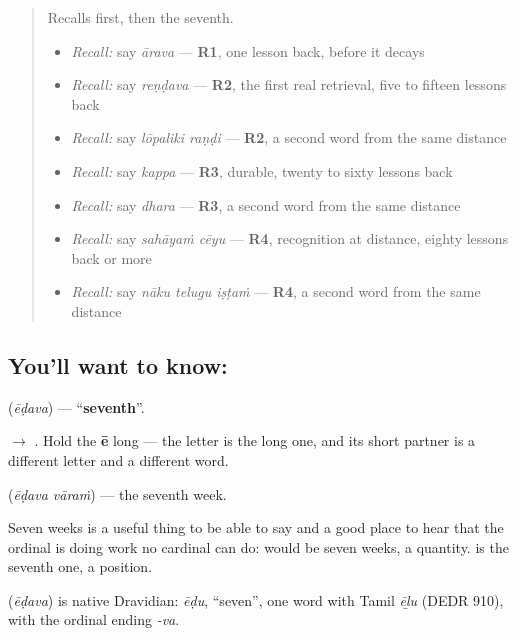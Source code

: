 \begin{quote}
Recalls first, then the seventh.

\begin{itemize}
\raggedright
  \item \emph{Recall:} say \emph{ārava} — \textbf{R1}, one lesson back, before it decays
  \item \emph{Recall:} say \emph{reṇḍava} — \textbf{R2}, the first real retrieval, five to fifteen lessons back
  \item \emph{Recall:} say \emph{lōpaliki raṇḍi} — \textbf{R2}, a second word from the same distance
  \item \emph{Recall:} say \emph{kappa} — \textbf{R3}, durable, twenty to sixty lessons back
  \item \emph{Recall:} say \emph{dhara} — \textbf{R3}, a second word from the same distance
  \item \emph{Recall:} say \emph{sahāyaṁ cēyu} — \textbf{R4}, recognition at distance, eighty lessons back or more
  \item \emph{Recall:} say \emph{nāku telugu iṣṭaṁ} — \textbf{R4}, a second word from the same distance
\end{itemize}
\end{quote}

\subsection*{You'll want to know: }
\textbf{} (\emph{ēḍava}) — \textquotedblleft{}\textbf{seventh}\textquotedblright{}.

\textbf{} $\to$ \textbf{}. Hold the \textbf{ē} long — the letter \textbf{} is the long one, and its short partner \textbf{} is a different letter and a different word.

\textbf{ } (\emph{ēḍava vāraṁ}) — the seventh week.

Seven weeks is a useful thing to be able to say and a good place to hear that the ordinal is doing work no cardinal can do: \emph{ } would be seven weeks, a quantity. \emph{ } is the seventh one, a position.

\begin{cousinweb}
\textbf{} (\emph{ēḍava}) is native Dravidian: \emph{ēḍu}, \textquotedblleft{}seven\textquotedblright{}, one word with Tamil \emph{ēḻu} (DEDR 910), with the ordinal ending \emph{-va}.
\end{cousinweb}

